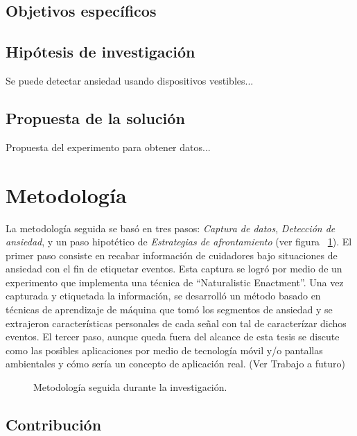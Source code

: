 \subsection{Objetivos espec\'ificos}
\subsection{Hip\'otesis de investigaci\'on}
	Se puede detectar ansiedad usando dispositivos vestibles...
\subsection{Propuesta de la soluci\'on}
	Propuesta del experimento para obtener datos...

\section{Metodolog\'ia}\label{secc:methodology}
La metodolog\'ia seguida se bas\'o en tres pasos: \textit{Captura de datos}, \textit{Detecci\'on de ansiedad}, y un paso hipot\'etico de \textit{Estrategias de afrontamiento} (ver figura ~\ref{fig:metodology}). El primer paso consiste en recabar informaci\'on de cuidadores bajo situaciones de ansiedad con el fin de etiquetar eventos. Esta captura se logr\'o por medio de un experimento que implementa una t\'ecnica de ``Naturalistic Enactment''. Una vez capturada y etiquetada la informaci\'on, se desarroll\'o un m\'etodo basado en t\'ecnicas de aprendizaje de m\'aquina que tom\'o los segmentos de ansiedad y se extrajeron caracter\'isticas personales de cada se\~nal con tal de caracter\'izar dichos eventos. El tercer paso, aunque queda fuera del alcance de esta tesis se discute como las posibles aplicaciones por medio de tecnolog\'ia m\'ovil y/o pantallas ambientales y c\'omo ser\'ia un concepto de aplicaci\'on real. (Ver Trabajo a futuro)
\begin{figure}[h]
        \centering
        \caption{Metodolog\'ia seguida durante la investigaci\'on.} \label{fig:metodology}
\end{figure}
\subsection{Contribuci\'on}
